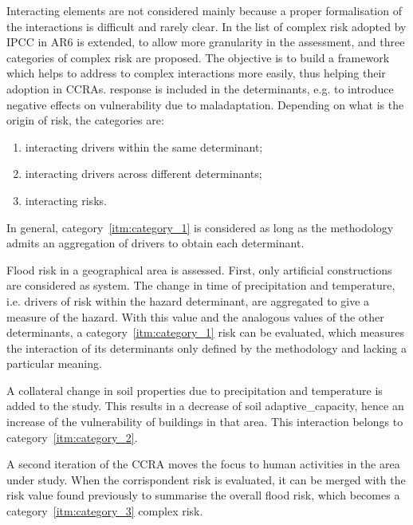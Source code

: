 Interacting elements are not considered mainly because a proper formalisation of the interactions is difficult and rarely clear. In \cite{2021SimpsonAFramework} the list of complex \gls{risk} adopted by \gls{IPCC} in \gls{AR6} is extended, to allow more granularity in the assessment, and three categories of complex \gls{risk} are proposed. The objective is to build a framework which helps to address to complex interactions more easily, thus helping their adoption in \glspl{CCRA}. \Gls{response} is included in the \glspl{determinant}, e.g. to introduce negative effects on \gls{vulnerability} due to \gls{maladaptation}.
Depending on what is the origin of \gls{risk}, the categories are:\cite[493]{2021SimpsonAFramework}
\begin{enumerate}
  \item \label{itm:category_1} interacting \glspl{driver} within the same \gls{determinant};
  \item \label{itm:category_2} interacting \glspl{driver} across different \glspl{determinant};
  \item \label{itm:category_3} interacting \glspl{risk}.
\end{enumerate}
In general, category~\ref{itm:category_1} is considered as long as the methodology admits an aggregation of \glspl{driver} to obtain each \gls{determinant}.
\begin{example}
  Flood \gls{risk} in a geographical area is assessed. First, only artificial constructions are considered as system.
  The change in time of precipitation and temperature, i.e. \glspl{driver} of \gls{risk} within the \gls{hazard} \gls{determinant}, are aggregated to give a measure of the \gls{hazard}. With this value and the analogous values of the other \glspl{determinant}, a category~\ref{itm:category_1} \gls{risk} can be evaluated, which measures the interaction of its \glspl{determinant} only defined by the methodology and lacking a particular meaning.
  
  A collateral change in soil properties due to precipitation and temperature is added to the study. This results in a decrease of soil \gls{adaptive_capacity}, hence an increase of the \gls{vulnerability} of buildings in that area. This interaction belongs to category~\ref{itm:category_2}.
  
  A second iteration of the \gls{CCRA} moves the focus to human activities in the area under study. When the corrispondent \gls{risk} is evaluated, it can be merged with the \gls{risk} value found previously to summarise the overall flood \gls{risk}, which becomes a category~\ref{itm:category_3} complex \gls{risk}.
\end{example}

